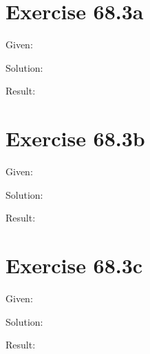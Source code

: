 \documentclass[a4paper, 10pt]{scrartcl}
\begin{document}
\section{Exercise 68.3a}

Given:

Solution:

Result:

\section{Exercise 68.3b}

Given:

Solution:

Result:

\section{Exercise 68.3c}

Given:

Solution:

Result:
\end{document}
